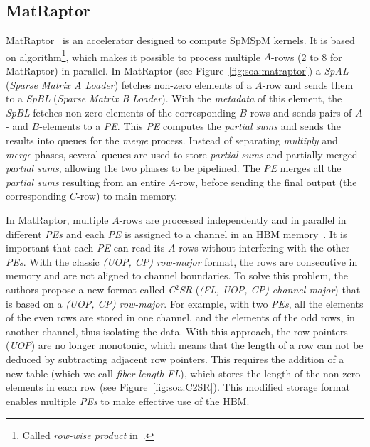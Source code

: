 
\subsection{MatRaptor}
\label{sec:soa:matraptor}

MatRaptor~\cite{Srivastava2020_MatRaptor} is an accelerator designed to compute SpMSpM kernels. It is based on  algorithm\footnote{Called \emph{row-wise product} in~\cite{Srivastava2020_MatRaptor}.}, which makes it possible to process multiple $A$-rows (2 to 8 for MatRaptor) in parallel. In MatRaptor (see Figure~\ref{fig:soa:matraptor}) a \emph{SpAL} (\emph{Sparse Matrix A Loader}) fetches non-zero elements of a $A$-row and sends them to a \emph{SpBL} (\emph{Sparse Matrix B Loader}). With the \emph{metadata} of this element, the \emph{SpBL} fetches non-zero elements of the corresponding $B$-rows and sends pairs of $A$- and $B$-elements to a \emph{PE}. This \emph{PE} computes the \emph{partial sums} and sends the results into queues for the \emph{merge} process. Instead of separating \emph{multiply} and \emph{merge} phases, several queues are used to store \emph{partial sums} and partially merged \emph{partial sums}, allowing the two phases to be pipelined. The \emph{PE} merges all the \emph{partial sums} resulting from an entire $A$-row, before sending the final output (the corresponding $C$-row) to main memory.

In MatRaptor, multiple $A$-rows are processed independently and in parallel in different \emph{PEs} and each \emph{PE} is assigned to a channel in an HBM memory~\cite{JESD235B}. It is important that each \emph{PE} can read its $A$-rows without interfering with the other \emph{PEs}. With the classic \emph{(UOP, CP) row-major} format, the rows are consecutive in memory and are not aligned to channel boundaries. To solve this problem, the authors propose a new format called \emph{C$^2$SR} (\emph{(FL, UOP, CP) channel-major}) that is based on a \emph{(UOP, CP) row-major}. For example, with two \emph{PEs}, all the elements of the even rows are stored in one channel, and the elements of the odd rows, in another channel, thus isolating the data. With this approach, the row pointers (\emph{UOP}) are no longer monotonic, which means that the length of a row can not be deduced by subtracting adjacent row pointers. This requires the addition of a new table (which we call \emph{fiber length} \emph{FL}), which stores the length of the non-zero elements in each row (see Figure~\ref{fig:soa:C2SR}). This modified storage format enables multiple \emph{PEs} to make effective use of the HBM.

